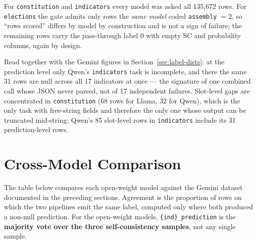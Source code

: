 \documentclass[11pt, a4paper]{article}
\begin{document}
For \texttt{constitution} and \texttt{indicators} every model was asked all 135{,}672
rows. For \texttt{elections} the gate admits only rows the \emph{same model} coded
\texttt{assembly} $=2$, so ``rows scored'' differs by model by construction and is not a
sign of failure; the remaining rows carry the pass-through label 0 with empty SC and
probability columns, again by design.

Read together with the Gemini figures in Section~\ref{sec:label-dists}: at the
prediction level only Qwen's \texttt{indicators} task is incomplete, and there the same
31 rows are null across all 17 indicators at once --- the signature of one combined call
whose JSON never parsed, not of 17 independent failures. Slot-level gaps are
concentrated in \texttt{constitution} (68 rows for Llama, 32 for Qwen), which is the only
task with free-string fields and therefore the only one whose output can be truncated
mid-string; Qwen's 85 slot-level rows in \texttt{indicators} include its 31
prediction-level rows.

\medskip

\section{Cross-Model Comparison}

The table below compares each open-weight model against the Gemini dataset
documented in the preceding sections. Agreement is the proportion of rows on which
the two pipelines emit the same label, computed only where both produced a non-null
prediction. For the open-weight models, \texttt{\{ind\}\_\allowbreak prediction} is
the \textbf{majority vote over the three self-consistency samples}, not any single
sample.
\end{document}
